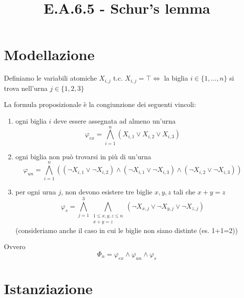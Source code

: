 \documentclass[10pt]{article}
\title{E.A.6.5 - Schur's lemma}
\author{}
\date{}
\begin{document}
\maketitle
\vspace{-6em}

\section{Modellazione}

Definiamo le variabili atomiche $X_{i,j}$ t.c. $X_{i,j} = \top \iff$ la biglia $i \in \{1, \dots, n\}$ si trova nell'urna $j \in \{1, 2, 3\}$

La formula proposizionale è la congiunzione dei seguenti vincoli:

\begin{enumerate}
    \item ogni biglia $i$ deve essere assegnata ad almeno un'urna
        $$ \varphi_{ex} = \bigwedge_{i=1}^{n} (X_{i,1} \lor X_{i,2} \lor X_{i,3}) $$

    \item ogni biglia non può trovarsi in più di un'urna
    $$ \varphi_{un} = \bigwedge_{i=1}^{n} \left( (\neg X_{i,1} \lor \neg X_{i,2}) \land (\neg X_{i,1} \lor \neg X_{i,3}) \land (\neg X_{i,2} \lor \neg X_{i,3}) \right) $$

    \item per ogni urna $j$, non devono esistere tre biglie $x, y, z$ tali che $x + y = z$    
        $$ \varphi_{s} = \bigwedge_{j=1}^{3} \bigwedge_{\substack{1 \le x, y, z \le n \\ x+y=z}} (\neg X_{x,j} \lor \neg X_{y,j} \lor \neg X_{z,j}) $$
        \subitem (consideriamo anche il caso in cui le biglie non siano distinte (es. 1+1=2))
\end{enumerate}


Ovvero
$$ \Phi_n = \varphi_{ex} \land \varphi_{un} \land \varphi_{s} $$

\section{Istanziazione}
\end{document}
